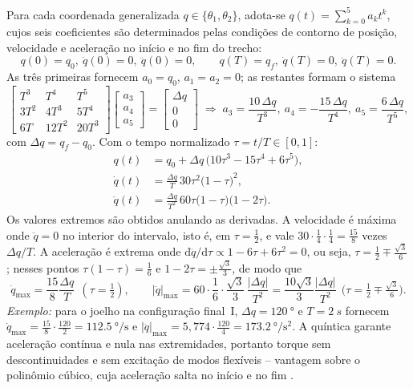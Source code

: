\documentclass[12pt,a4paper,twoside]{article}
\numberwithin{equation}{section}
\begin{document}
Para cada coordenada generalizada $q\in\{\theta_1,\theta_2\}$, adota-se
$q(t) = \sum_{k=0}^{5} a_k t^k$, cujos seis coeficientes são determinados pelas condições
de contorno de posição, velocidade e aceleração no início e no fim do trecho:
\begin{equation}
  q(0)=q_0,\ \dot q(0)=0,\ \ddot q(0)=0,\qquad q(T)=q_f,\ \dot q(T)=0,\ \ddot q(T)=0 .
\end{equation}
As três primeiras fornecem $a_0 = q_0$, $a_1 = a_2 = 0$; as restantes formam o sistema
\begin{equation}
  \begin{bmatrix} T^3 & T^4 & T^5\\ 3T^2 & 4T^3 & 5T^4 \\ 6T & 12T^2 & 20T^3 \end{bmatrix}
  \begin{bmatrix} a_3\\ a_4\\ a_5\end{bmatrix}
  = \begin{bmatrix} \Delta q\\ 0\\ 0\end{bmatrix}
  \;\Rightarrow\;
  a_3 = \frac{10\,\Delta q}{T^3},\ a_4 = -\frac{15\,\Delta q}{T^4},\ a_5 = \frac{6\,\Delta q}{T^5},
\end{equation}
com $\Delta q = q_f - q_0$. Com o tempo normalizado $\tau = t/T\in[0,1]$:
\begin{align}
  q(t) &= q_0 + \Delta q\,\big(10\tau^3 - 15\tau^4 + 6\tau^5\big), \label{eq:quint}\\
  \dot q(t) &= \frac{\Delta q}{T}\,30\tau^2\big(1-\tau\big)^2, \\
  \ddot q(t) &= \frac{\Delta q}{T^2}\,60\tau\big(1-\tau\big)\big(1-2\tau\big).
\end{align}
Os valores extremos são obtidos anulando as derivadas. A velocidade é máxima onde
$\ddot q = 0$ no interior do intervalo, isto é, em $\tau = \tfrac12$, e vale
$30\cdot\tfrac14\cdot\tfrac14 = \tfrac{15}{8}$ vezes $\Delta q/T$. A aceleração é extrema onde
$\mathrm d\ddot q/\mathrm d\tau \propto 1 - 6\tau + 6\tau^2 = 0$, ou seja,
$\tau = \tfrac12 \mp \tfrac{\sqrt3}{6}$; nesses pontos $\tau(1-\tau) = \tfrac16$ e
$1 - 2\tau = \pm\tfrac{\sqrt3}{3}$, de modo que
\begin{equation}
  \dot q_{\max} = \frac{15}{8}\frac{\Delta q}{T}\ \ (\tau=\tfrac12),\qquad
  |\ddot q|_{\max} = 60\cdot\frac16\cdot\frac{\sqrt3}{3}\,\frac{|\Delta q|}{T^2} = \frac{10\sqrt3}{3}\frac{|\Delta q|}{T^2}\ \ \Big(\tau = \tfrac12 \mp \tfrac{\sqrt3}{6}\Big).
  \label{eq:picos}
\end{equation}
\emph{Exemplo:} para o joelho na configuração final~I, $\Delta q = \SI{120}{\degree}$ e $T = \SI{2}{s}$
fornecem $\dot q_{\max} = \tfrac{15}{8}\cdot\tfrac{120}{2} = \SI{112,5}{\degree\per\s}$ e
$|\ddot q|_{\max} = 5{,}774\cdot\tfrac{120}{4} = \SI{173,2}{\degree\per\s\squared}$.
A quíntica garante aceleração contínua e nula nas extremidades, portanto torque sem
descontinuidades e sem excitação de modos flexíveis -- vantagem sobre o polinômio
cúbico, cuja aceleração salta no início e no fim \cite{craig2005,siciliano2009}.
\end{document}
